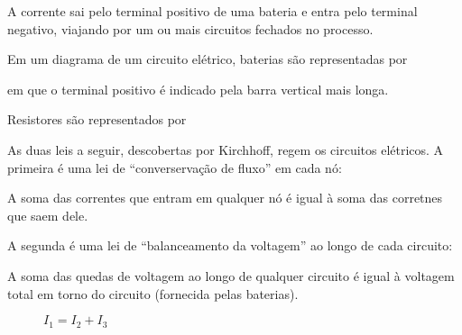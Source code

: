 \documentclass{beamer}
\begin{document}
    \begin{frame}

        A corrente sai pelo terminal positivo de uma bateria e entra pelo terminal negativo, viajando por um ou mais circuitos fechados no processo. 

        Em um diagrama de um circuito elétrico, baterias são representadas por
        \begin{center}
        \end{center}
        em que o terminal positivo é indicado pela barra vertical mais longa.

        Resistores são representados por
        \begin{center}
        \end{center}
    \end{frame}

    \begin{frame}
        As duas leis a seguir, descobertas por Kirchhoff, regem os circuitos elétricos. A primeira é uma lei de ``converservação de fluxo'' em cada nó:
        \begin{definicao}
            A soma das correntes que entram em qualquer nó é igual à soma das corretnes que saem dele.
        \end{definicao}

        A segunda é uma lei de ``balanceamento da voltagem''  ao longo de cada circuito:

        \begin{definicao}
            A soma das quedas de voltagem ao longo de qualquer circuito é igual à voltagem total em torno do circuito (fornecida pelas baterias).
        \end{definicao}
    \end{frame}

    \begin{frame}
        \begin{figure}[!h]
            \centering
            
            \caption{$I_1 = I_2 + I_3$}
        \end{figure}
    \end{frame}
\end{document}
